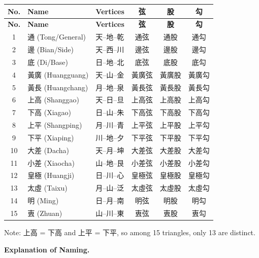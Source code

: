 \documentclass[11pt,a4paper]{article}
\begin{document}
\begin{longtable}{|c|l|l|c|c|c|}
\hline
\textbf{No.} & \textbf{Name} & \textbf{Vertices} & \textbf{弦} & \textbf{股} & \textbf{勾} \\
\hline
\endfirsthead
\hline
\textbf{No.} & \textbf{Name} & \textbf{Vertices} & \textbf{弦} & \textbf{股} & \textbf{勾} \\
\hline
\endhead
1 & 通 (Tong/General) & 天--地--乾 & 通弦 & 通股 & 通勾 \\
2 & 邊 (Bian/Side) & 天--西--川 & 邊弦 & 邊股 & 邊勾 \\
3 & 底 (Di/Base) & 日--地--北 & 底弦 & 底股 & 底勾 \\
4 & 黃廣 (Huangguang) & 天--山--金 & 黃廣弦 & 黃廣股 & 黃廣勾 \\
5 & 黃長 (Huangchang) & 月--地--泉 & 黃長弦 & 黃長股 & 黃長勾 \\
6 & 上高 (Shanggao) & 天--日--旦 & 上高弦 & 上高股 & 上高勾 \\
7 & 下高 (Xiagao) & 日--山--朱 & 下高弦 & 下高股 & 下高勾 \\
8 & 上平 (Shangping) & 月--川--青 & 上平弦 & 上平股 & 上平勾 \\
9 & 下平 (Xiaping) & 川--地--夕 & 下平弦 & 下平股 & 下平勾 \\
10 & 大差 (Dacha) & 天--月--坤 & 大差弦 & 大差股 & 大差勾 \\
11 & 小差 (Xiaocha) & 山--地--艮 & 小差弦 & 小差股 & 小差勾 \\
12 & 皇極 (Huangji) & 日--川--心 & 皇極弦 & 皇極股 & 皇極勾 \\
13 & 太虛 (Taixu) & 月--山--泛 & 太虛弦 & 太虛股 & 太虛勾 \\
14 & 明 (Ming) & 日--月--南 & 明弦 & 明股 & 明勾 \\
15 & 叀 (Zhuan) & 山--川--東 & 叀弦 & 叀股 & 叀勾 \\
\hline
\end{longtable}

Note: 上高 = 下高 and 上平 = 下平, so among 15 triangles, only 13 are distinct.

\vspace{0.3cm}

\textbf{Explanation of Naming.}
\end{document}
